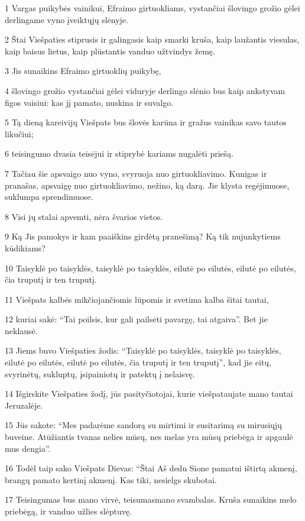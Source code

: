 \par 1 Vargas puikybės vainikui, Efraimo girtuokliams, vystančiai šlovingo grožio gėlei derlingame vyno įveiktųjų slėnyje. 
\par 2 Štai Viešpaties stiprusis ir galingasis kaip smarki kruša, kaip laužantis viesulas, kaip baisus lietus, kaip plūstantis vanduo užtvindys žemę. 
\par 3 Jis sunaikins Efraimo girtuoklių puikybę, 
\par 4 šlovingo grožio vystančiai gėlei viduryje derlingo slėnio bus kaip ankstyvam figos vaisiui: kas jį pamato, nuskina ir suvalgo. 
\par 5 Tą dieną kareivijų Viešpats bus šlovės karūna ir gražus vainikas savo tautos likučiui; 
\par 6 teisingumo dvasia teisėjui ir stiprybė kariams nugalėti priešą. 
\par 7 Tačiau šie apsvaigo nuo vyno, svyruoja nuo girtuokliavimo. Kunigas ir pranašas, apsvaigę nuo girtuokliavimo, nežino, ką darą. Jie klysta regėjimuose, suklumpa sprendimuose. 
\par 8 Visi jų stalai apvemti, nėra švarios vietos. 
\par 9 Ką Jis pamokys ir kam paaiškins girdėtą pranešimą? Ką tik nujunkytiems kūdikiams? 
\par 10 Taisyklė po taisyklės, taisyklė po taisyklės, eilutė po eilutės, eilutė po eilutės, čia truputį ir ten truputį. 
\par 11 Viešpats kalbės mikčiojančiomis lūpomis ir svetima kalba šitai tautai, 
\par 12 kuriai sakė: “Tai poilsis, kur gali pailsėti pavargę, tai atgaiva”. Bet jie neklausė. 
\par 13 Jiems buvo Viešpaties žodis: “Taisyklė po taisyklės, taisyklė po taisyklės, eilutė po eilutės, eilutė po eilutės, čia truputį ir ten truputį”, kad jie eitų, svyrinėtų, sukluptų, įsipainiotų ir patektų į nelaisvę. 
\par 14 Išgirskite Viešpaties žodį, jūs pasityčiotojai, kurie viešpataujate mano tautai Jeruzalėje. 
\par 15 Jūs sakote: “Mes padarėme sandorą su mirtimi ir susitarimą su mirusiųjų buveine. Atūžiantis tvanas nelies mūsų, nes melas yra mūsų priebėga ir apgaulė mus dengia”. 
\par 16 Todėl taip sako Viešpats Dievas: “Štai Aš dedu Sione pamatui ištirtą akmenį, brangų pamato kertinį akmenį. Kas tiki, nesielgs skubotai. 
\par 17 Teisingumas bus mano virvė, teisumas­mano svambalas. Kruša sunaikins melo priebėgą, ir vanduo užlies slėptuvę. 
